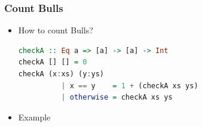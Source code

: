 \documentclass[10pt]{beamer}
\begin{document}

\begin{frame}[fragile]
\frametitle{Count Bulls}
\begin{itemize}%
    \item How to count Bulls?\\
     \begin{lstlisting}[language=Haskell]
checkA :: Eq a => [a] -> [a] -> Int
checkA [] [] = 0
checkA (x:xs) (y:ys)
          | x == y    = 1 + (checkA xs ys)
          | otherwise = checkA xs ys
    \end{lstlisting}
    
    \item Example\\ 
    
\end{itemize}
    
\end{frame}



\end{document}
